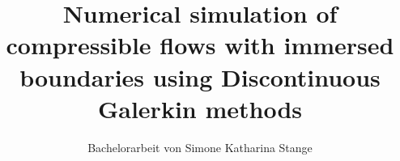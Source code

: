 	\title{Numerical simulation of compressible flows with immersed boundaries using Discontinuous Galerkin methods}
	\subtitle{Bachelorarbeit von Simone Katharina Stange}
	\subsubtitle{\today}
	
